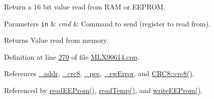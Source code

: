 Return a 16 bit value read from R\+AM or E\+E\+P\+R\+OM. 


\begin{DoxyParams}[1]{Parameters}
\mbox{\tt in}  & {\em cmd} & Command to send (register to read from). \\
\hline
\end{DoxyParams}
\begin{DoxyReturn}{Returns}
Value read from memory. 
\end{DoxyReturn}


Definition at line \mbox{\hyperlink{_m_l_x90614_8cpp_source_l00270}{270}} of file \mbox{\hyperlink{_m_l_x90614_8cpp_source}{M\+L\+X90614.\+cpp}}.



References \mbox{\hyperlink{_m_l_x90614_8h_source_l00145}{\+\_\+addr}}, \mbox{\hyperlink{_m_l_x90614_8h_source_l00147}{\+\_\+crc8}}, \mbox{\hyperlink{_m_l_x90614_8h_source_l00148}{\+\_\+pec}}, \mbox{\hyperlink{_m_l_x90614_8h_source_l00146}{\+\_\+rw\+Error}}, and \mbox{\hyperlink{_crc8_8cpp_source_l00042}{C\+R\+C8\+::crc8()}}.



Referenced by \mbox{\hyperlink{_m_l_x90614_8cpp_source_l00344}{read\+E\+E\+Prom()}}, \mbox{\hyperlink{_m_l_x90614_8cpp_source_l00084}{read\+Temp()}}, and \mbox{\hyperlink{_m_l_x90614_8cpp_source_l00354}{write\+E\+E\+Prom()}}.


